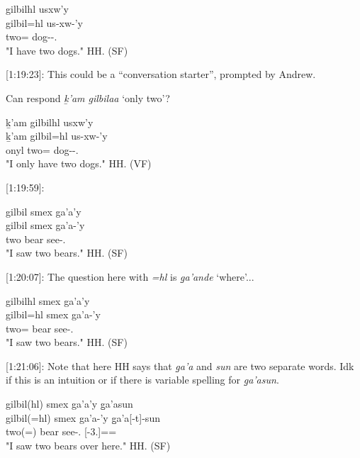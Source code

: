 \begin{exe}
    \ex \glll
    gilbilhl usxw'y \\
    gilbil=hl us-xw-'y \\
    two=\Cn{} dog-\Val{}-\Fsg{}.\Ii{} \\
    \glt "I have two dogs." \hfill HH.\ElicitationDate{} (SF)
\end{exe}

[1:19:23]: This could be a ``conversation starter'', prompted by Andrew. 

Can respond \textit{ḵ'am gilbilaa} `only two'?

\begin{exe}
    \ex \glll
    ḵ'am gilbilhl usxw'y \\
    ḵ'am  gilbil=hl us-xw-'y \\
    onyl two=\Cn{} dog-\Val{}-\Fsg{}.\Ii{} \\
    \glt "I only have two dogs." \hfill HH.\ElicitationDate{} (VF)
\end{exe}

[1:19:59]:

\begin{exe}
    \ex \glll
    gilbil smex ga'a'y  \\
    gilbil smex ga'a-'y \\
    two bear see-\Fsg{}.\Ii{}  \\
    \glt "I saw two bears."  \hfill HH.\ElicitationDate{} (SF)
\end{exe}

[1:20:07]: The question here with \textit{=hl} is \textit{g̱a'ande} `where'...

\begin{exe}
    \ex \glll
    gilbilhl smex ga'a'y  \\
    gilbil=hl smex ga'a-'y \\
    two=\Cn{} bear see-\Fsg{}.\Ii{}  \\
    \glt "I saw two bears."  \hfill HH.\ElicitationDate{} (SF)
\end{exe}

[1:21:06]: Note that here HH says that \textit{g̱a'a} and \textit{sun} are two separate words. Idk if this is an intuition or if there is variable spelling for \textit{g̱a'asun}.

\begin{exe}
    \ex \glll
    gilbil(hl) smex ga'a'y g̱a'asun  \\
    gilbil(=hl) smex ga'a-'y g̱a'a[-t]-sun \\
    two(=\Cn{}) bear see-\Fsg{}.\Ii{} \Loc{}[-3.\Ii{}]=\Pn{}=\Demprox{} \\
    \glt "I saw two bears over here."  \hfill HH.\ElicitationDate{} (SF)
\end{exe}

